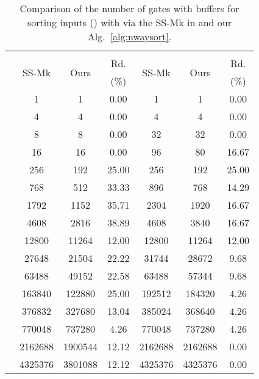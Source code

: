 \documentclass[10pt,journal,cspaper,compsoc]{IEEEtran}
\begin{document}
\begin{table}[!t]
\caption{Comparison of the number of gates with buffers for sorting  inputs () with  via the SS-Mk in \cite{gao1997sloping} and our Alg.~\ref{alg:nwaysort}.}\label{tab:comp_n2010TG}
\begin{center}
\begin{tabular}{|c|c|c|c|c|c|c|}
\hline
\multirow{3}{*}{} & \multicolumn{3}{c|}{} & \multicolumn{3}{c|}{}\\
\cline{2-7}
& \multirow{2}{*}{SS-Mk} & \multirow{2}{*}{Ours} & Rd. & \multirow{2}{*}{SS-Mk} & \multirow{2}{*}{Ours} & Rd. \\
& & & (\%) & & & (\%)\\
\hline
	&	1   &   1	&	0.00	    &	1	 &	 1  &   0.00\\
\hline
	&	4   &   4	&	0.00		&	4    &   4	&	0.00\\
\hline
	&	8   &     8	&	0.00	    &	32   &   32	&	0.00\\
\hline
	&	16  &   16	&	0.00		&	96	&	 80  &    16.67\\
\hline
	&	256  &   192	&	25.00		&	256 & 192	&	25.00\\
\hline
	&	768    &   512	&	33.33		&	896	&	768 & 14.29\\
\hline
	&	1792   &   1152	&	35.71		&	2304	&	1920 & 16.67\\
\hline
	&	4608	&    2816	&	38.89	&	4608	&	3840 & 16.67	\\
\hline
	&	12800   &   11264	&	12.00		&	12800	&	11264    & 12.00\\
\hline
	&	27648   &   21504	&	22.22		&	31744	&	28672 & 9.68\\
\hline
	&	63488	&   49152	&	22.58 	&	63488	&	57344 & 9.68\\
\hline
	&	163840	&   122880	&	25.00 	&	192512	&	184320 & 4.26\\
\hline
	&	376832	&   327680	&	13.04	&	385024	&	368640 & 4.26\\
\hline
   &   770048  &   737280  &   4.26   &   770048  &  737280 &  4.26\\
\hline
   &   2162688  &   1900544  &   12.12   &   2162688  &  2162688 &  0.00 \\
\hline
   &   4325376  &   3801088  &   12.12   &   4325376  &  4325376 &  0.00 \\
\hline
\end{tabular}
\end{center}
\end{table}
\end{document}
